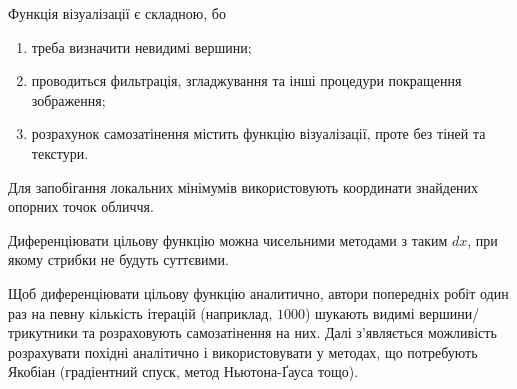 Функція візуалізації є складною, бо
\begin{enumerate}
  \item
    треба визначити невидимі вершини;
  \item
    проводиться фильтрація,
    згладжування та інші процедури покращення зображення;
  \item
    розрахунок самозатінення містить функцію візуалізації,
    проте без тіней та текстури.
\end{enumerate}

Для запобігання локальних мінімумів
використовують координати знайдених опорних точок обличчя.

Диференціювати цільову функцію можна чисельними методами з таким $dx$,
при якому стрибки не будуть суттєвими.

Щоб диференціювати цільову функцію аналитично,
автори попередніх робіт один раз на певну кількість ітерацій
(наприклад, $1000$)
шукають видимі вершини/трикутники та розраховують самозатінення на них.
Далі з'являється можливість розрахувати похідні аналітично
і використовувати у методах, що потребують Якобіан
(градіентний спуск, метод Ньютона-Ґауса тощо).
